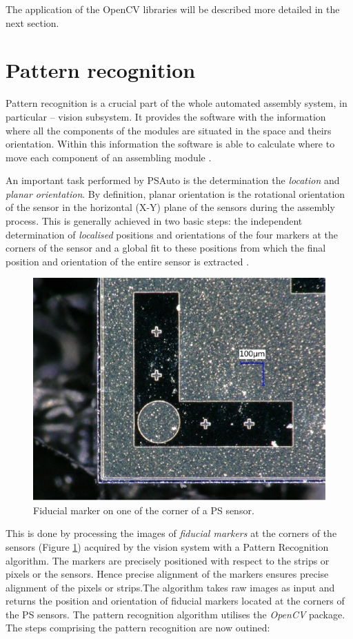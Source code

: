 The application of the OpenCV libraries will be described more detailed in the next section.

\section{Pattern recognition}

Pattern recognition is a crucial part of the whole automated assembly system, in particular -- vision subsystem. It provides the software with the information where all the components of the modules are situated in the space and theirs orientation. Within this information the software is able to calculate where to move each component of an assembling module \cite{AutomatedAssembly_tutorial}.

An important task performed by PSAuto is the determination the \emph{location} and \emph{planar orientation}. By definition, planar orientation is the rotational orientation of the sensor in the horizontal (X-Y) plane of the sensors during the assembly process. This is generally achieved in two basic steps: the independent determination of \emph{localised} positions and orientations of the four markers at the corners of the sensor and a global fit to these positions from which the final position and orientation of the entire sensor is extracted \cite{AutomatedAssembly_tutorial}. 

\begin{figure}[ht]\centering
\includegraphics[width=0.7\linewidth]{Data/Control_Software/Fiducial_marker.png}
\caption{Fiducial marker on one of the corner of a PS sensor.}
\label{fig:fiducial_marker}
\end{figure}

This is done by processing the images of \emph{fiducial markers} at the corners of the sensors (Figure \ref{fig:fiducial_marker}) acquired by the vision system with a Pattern Recognition algorithm. The markers are precisely positioned with respect to the strips or pixels or the sensors. Hence precise alignment of the markers ensures precise alignment of the pixels or strips.The algorithm takes raw images as input and returns the position and orientation of fiducial markers located at the corners of the PS sensors. The pattern recognition algorithm utilises the \emph{OpenCV} package. The steps comprising the pattern recognition are now outined:


